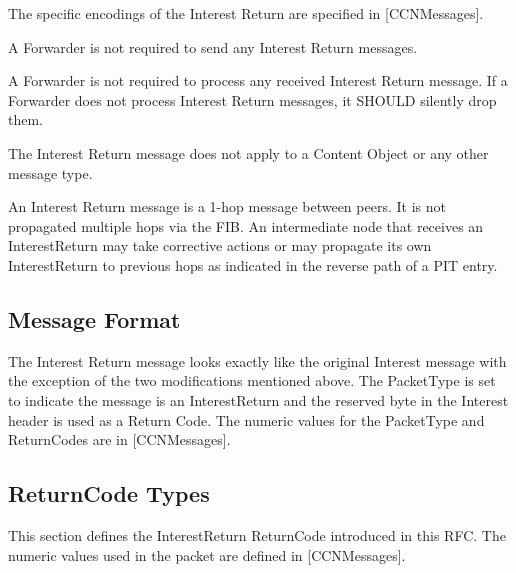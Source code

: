 \documentclass[12pt]{report}
\begin{document}
The specific encodings of the Interest Return are specified in
[CCNMessages].

A Forwarder is not required to send any Interest Return messages.

A Forwarder is not required to process any received Interest Return
message.  If a Forwarder does not process Interest Return messages,
it SHOULD silently drop them.

The Interest Return message does not apply to a Content Object or any
other message type.

An Interest Return message is a 1-hop message between peers.  It is
not propagated multiple hops via the FIB.  An intermediate node that
receives an InterestReturn may take corrective actions or may
propagate its own InterestReturn to previous hops as indicated in the
reverse path of a PIT entry.

\subsection{Message Format}
The Interest Return message looks exactly like the original Interest
message with the exception of the two modifications mentioned above.
The PacketType is set to indicate the message is an InterestReturn
and the reserved byte in the Interest header is used as a Return
Code.  The numeric values for the PacketType and ReturnCodes are in
[CCNMessages].

\subsection{ReturnCode Types}
This section defines the InterestReturn ReturnCode introduced in this
RFC.  The numeric values used in the packet are defined in
[CCNMessages].
\end{document}
